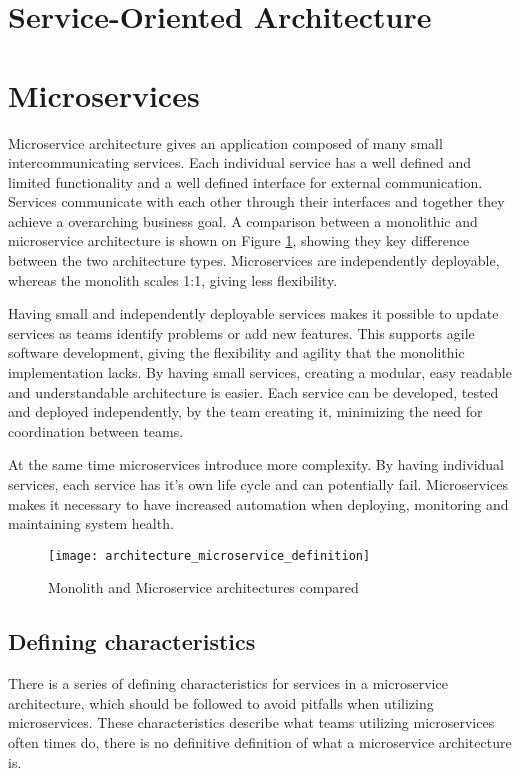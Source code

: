 \section{Service-Oriented Architecture}


\section{Microservices}
Microservice architecture gives an application composed of many small intercommunicating services. Each individual service has a well defined and limited functionality and a well defined interface for external communication. Services communicate with each other through their interfaces and together they achieve a overarching business goal\cite[p.~2]{newman2015microservices}. A comparison between a monolithic and microservice architecture is shown on Figure \ref{fig:architecture_microservice_definition}, showing they key difference between the two architecture types. Microservices are independently deployable, whereas the monolith scales 1:1, giving less flexibility. 

Having small and independently deployable services makes it possible to update services as teams identify problems or add new features. This supports agile software development, giving the flexibility and agility that the monolithic implementation lacks. By having small services, creating a modular, easy readable and understandable architecture is easier. Each service can be developed, tested and deployed independently, by the team creating it, minimizing the need for coordination between teams\cite{kniberg2014spotify}.

At the same time microservices introduce more complexity. By having individual services, each service has it's own life cycle and can potentially fail. Microservices makes it necessary to have increased automation when deploying, monitoring and maintaining system health\cite{meshenberg2016microservices}.


\begin{figure}[!htb]
  \texttt{[image: architecture\_microservice\_definition]}  
  \caption{Monolith and Microservice architectures compared}
  \label{fig:architecture_microservice_definition}
\end{figure}

\subsection{Defining characteristics}
There is a series of defining characteristics for services in a microservice architecture, which should be followed to avoid pitfalls when utilizing microservices. These characteristics describe what teams utilizing microservices often times do, there is no definitive definition of what a microservice architecture is.

